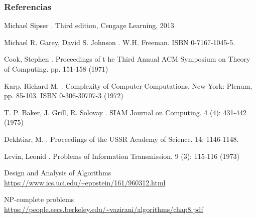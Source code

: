 \documentclass[10pt, mathserif, profesionalfont]{beamer}
\begin{document}
\begin{frame}[allowframebreaks]
  \frametitle<presentation>{Referencias}
    
  \begin{thebibliography}{10}
    
  \beamertemplatebookbibitems

    Michael Sipser
    .
    \newblock Third edition, Cengage Learning, 2013
   
    Michael R. Garey, David S. Johnson
    .
    \newblock W.H. Freeman. ISBN 0-7167-1045-5.
 
    
  \beamertemplatearticlebibitems

    Cook, Stephen
    .
    \newblock Proceedings of t he Third Annual ACM Symposium on Theory of Computing. pp. 151-158 (1971)
    
    Karp, Richard M.
    .
    \newblock Complexity of Computer Computations. New York: Plenum, pp. 85-103. ISBN 0-306-30707-3 (1972)
    
    T. P. Baker, J. Grill, R. Solovay
    .
    \newblock SIAM Journal on Computing. 4 (4): 431-442 (1975)
    
    Dekhtiar, M.
    .
    \newblock Proceedings of the USSR Academy of Science. 14: 1146-1148.
    
    Levin, Leonid
    .
    \newblock Problems of Information Transmission. 9 (3): 115-116 (1973)
    
    Design and Analysis of Algorithms
    \newblock \url{https://www.ics.uci.edu/~eppstein/161/960312.html}
    
    NP-complete problems
    \newblock \url{https://people.eecs.berkeley.edu/~vazirani/algorithms/chap8.pdf}
  \end{thebibliography}
\end{frame}
\end{document}
